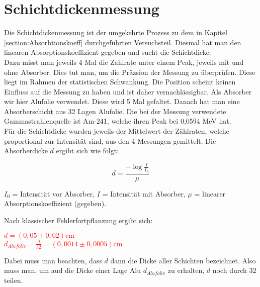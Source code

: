 \section{Schichtdickenmessung}

Die Schichtdickenmessung ist der umgekehrte Prozess zu dem in Kapitel \ref{section:Absorbtionskoeff} durchgeführten Versuchsteil. Diesmal hat man den linearen Absorptionskoeffizient gegeben und 
sucht die Schichtdicke.\\
Dazu misst man jeweils 4 Mal die Zahlrate unter einem Peak, jeweils mit und ohne Absorber. Dies tut man, um die Präzsion der Messung zu überprüfen. Diese liegt im Rahmen der 
statistischen Schwankung. Die Position scheint keinen Einfluss auf die Messung zu haben und ist daher vernachlässigbar. Als Absorber wir hier Alufolie verwendet. Diese wird 
5 Mal gefaltet. Danach hat man eine Absorberschicht aus 32 Lagen Alufolie. Die bei der Messung verwendete Gammastrahlenquelle ist Am-241, welche ihren Peak bei 0,0594 MeV hat. \\

Für die Schichtdicke wurden jeweils der Mittelwert der Zählraten, welche proportional zur Intensität sind, aus den 4 Messungen gemittelt. Die Absorberdicke $d$ ergibt sich wie folgt:

\begin{equation}
    d = \frac{-\log{\frac{I}{I_0}}}{\mu}
\end{equation}

$I_0$ = Intensität vor Absorber, $I$ = Intensität mit Absorber, $\mu$ = linearer Absorptionskoeffizient (gegeben).
\newpage

Nach klassischer Fehlerfortpflanzung ergibt sich:

\begin{center}
    \centering
    \textcolor{red}{$ d = (0,05\pm0,02) \mathrm{cm}$}\\
    \textcolor{red}{$ d_{Alufolie} = \frac{d}{32} = (0,0014\pm0,0005) \mathrm{cm}$}\\
\end{center}

Dabei muss man beachten, dass $d$ dann die Dicke aller Schichten bezeichnet. Also muss man, um aud die Dicke einer Lage Alu $d_{Alufolie}$ zu erhalten, 
$d$ noch durch 32 teilen.